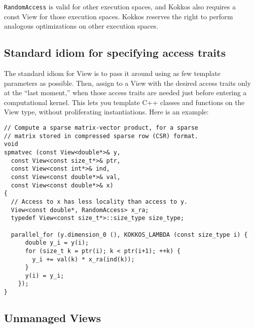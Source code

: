 \lstinline!RandomAccess! is valid for other execution spaces, and Kokkos
also requires a const View for those execution spaces.  Kokkos
reserves the right to perform analogous optimizations on other
execution spaces.

\subsection{Standard idiom for specifying access traits}

The standard idiom for View is to pass it around using as few template
parameters as possible.  Then, assign to a View with the desired
access traits only at the ``last moment,'' when those access traits
are needed just before entering a computational kernel.  This lets you
template C++ classes and functions on the View type, without
proliferating instantiations.  Here is an example:

\begin{lstlisting}
// Compute a sparse matrix-vector product, for a sparse
// matrix stored in compressed sparse row (CSR) format.
void
spmatvec (const View<double*>& y, 
  const View<const size_t*>& ptr,
  const View<const int*>& ind,
  const View<const double*>& val,
  const View<const double*>& x)
{
  // Access to x has less locality than access to y.
  View<const double*, RandomAccess> x_ra;
  typedef View<const size_t*>::size_type size_type;

  parallel_for (y.dimension_0 (), KOKKOS_LAMBDA (const size_type i) {
      double y_i = y(i);
      for (size_t k = ptr(i); k < ptr(i+1); ++k) {
        y_i += val(k) * x_ra(ind(k));
      }
      y(i) = y_i;
    });
}
\end{lstlisting}

\subsection{Unmanaged Views}

